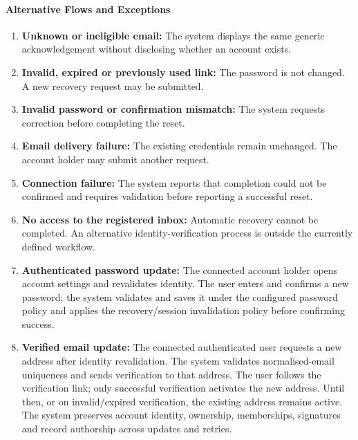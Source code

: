 \paragraph{Alternative Flows and Exceptions}

\begin{enumerate}[label=A\arabic*.]
        \item \textbf{Unknown or ineligible email:}
        The system displays the same generic acknowledgement
        without disclosing whether an account exists.

        \item \textbf{Invalid, expired or previously used link:}
        The password is not changed.
        A new recovery request may be submitted.

        \item \textbf{Invalid password or confirmation mismatch:}
        The system requests correction before completing
        the reset.

        \item \textbf{Email delivery failure:}
        The existing credentials remain unchanged.
        The account holder may submit another request.

        \item \textbf{Connection failure:}
        The system reports that completion could not be
        confirmed and requires validation before reporting
        a successful reset.

        \item \textbf{No access to the registered inbox:}
        Automatic recovery cannot be completed.
        An alternative identity-verification process is
        outside the currently defined workflow.

        \item \textbf{Authenticated password update:}
        The connected account holder opens account settings and revalidates identity.
        The user enters and confirms a new password; the system validates and saves
        it under the configured password policy and applies the recovery/session
        invalidation policy before confirming success.

        \item \textbf{Verified email update:}
        The connected authenticated user requests a new address after identity
        revalidation. The system validates normalised-email uniqueness and sends
        verification to that address. The user follows the verification link;
        only successful verification activates the new address. Until then, or
        on invalid/expired verification, the existing address remains active.
        The system preserves account identity, ownership, memberships, signatures
        and record authorship across updates and retries.
    \end{enumerate}

